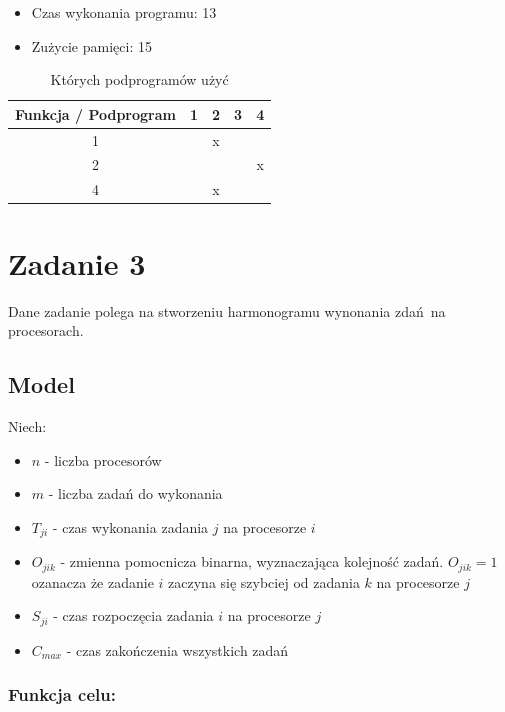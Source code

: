 \documentclass[12pt, a4paper]{article}
\begin{document}
\begin{itemize}
    \item Czas wykonania programu: 13
    \item Zużycie pamięci: 15
\end{itemize}

\begin{table}[H]
\begin{center}
\begin{tabular}{|c|c|c|c|c|}
  \hline
  Funkcja / Podprogram & 1 & 2 & 3 & 4 \\
  \hline
  1 & & x & &  \\
  \hline
  2 &  &  & & x \\
  \hline
  4 &  & x &  &  \\
  \hline
\end{tabular} 
\caption{Których podprogramów użyć}
\end{center}
\end{table}

\section{Zadanie 3}

Dane zadanie polega na stworzeniu harmonogramu wynonania zdań na procesorach.

\subsection{Model}

Niech:
\begin{itemize}
    \item $n$ - liczba procesorów
    \item $m$ - liczba zadań do wykonania
    \item $T_{ji}$ - czas wykonania zadania $j$ na procesorze $i$
    \item $O_{jik}$ - zmienna pomocnicza binarna, wyznaczająca kolejność zadań. $O_{jik} = 1$ ozanacza że zadanie $i$ zaczyna się szybciej od zadania $k$ na procesorze $j$
    \item $S_{ji}$ - czas rozpoczęcia zadania $i$ na procesorze $j$
    \item $C_{max}$ - czas zakończenia wszystkich zadań
    
\end{itemize}

\subsubsection*{Funkcja celu:}
\end{document}
